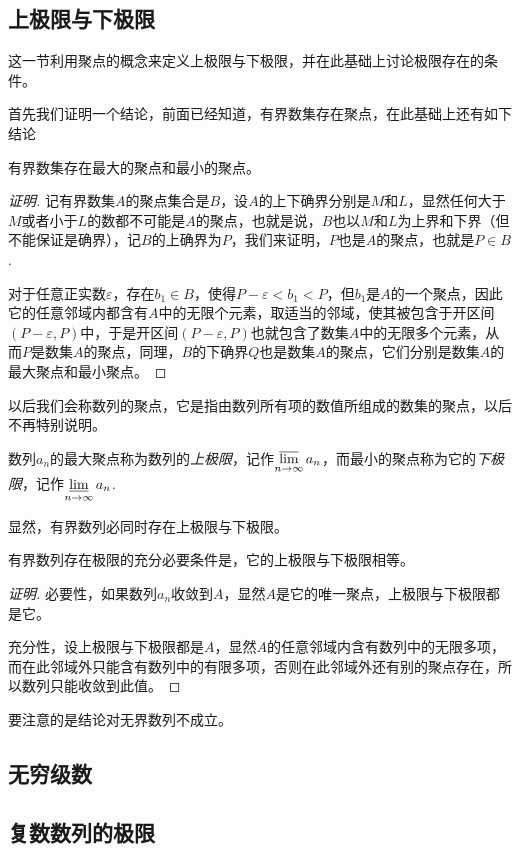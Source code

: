 \subsection{上极限与下极限}
\label{sec:upper-limit-and-lower-limit}

这一节利用聚点的概念来定义上极限与下极限，并在此基础上讨论极限存在的条件。

首先我们证明一个结论，前面已经知道，有界数集存在聚点，在此基础上还有如下结论
\begin{theorem}
  有界数集存在最大的聚点和最小的聚点。
\end{theorem}

\begin{proof}[证明]
  记有界数集$A$的聚点集合是$B$，设$A$的上下确界分别是$M$和$L$，显然任何大于$M$或者小于$L$的数都不可能是$A$的聚点，也就是说，$B$也以$M$和$L$为上界和下界（但不能保证是确界），记$B$的上确界为$P$，我们来证明，$P$也是$A$的聚点，也就是$P \in B$.

  对于任意正实数$\varepsilon$，存在$b_1 \in B$，使得$P-\varepsilon < b_1 < P$，但$b_1$是$A$的一个聚点，因此它的任意邻域内都含有$A$中的无限个元素，取适当的邻域，使其被包含于开区间$(P-\varepsilon,P)$中，于是开区间$(P-\varepsilon,P)$也就包含了数集$A$中的无限多个元素，从而$P$是数集$A$的聚点，同理，$B$的下确界$Q$也是数集$A$的聚点，它们分别是数集$A$的最大聚点和最小聚点。
\end{proof}

以后我们会称数列的聚点，它是指由数列所有项的数值所组成的数集的聚点，以后不再特别说明。

\begin{definition}
  数列$a_n$的最大聚点称为数列的\emph{上极限}，记作$\varlimsup\limits_{n \to \infty}a_n$，而最小的聚点称为它的\emph{下极限}，记作$\varliminf\limits_{n \to \infty} a_n$.
\end{definition}

显然，有界数列必同时存在上极限与下极限。

\begin{theorem}
有界数列存在极限的充分必要条件是，它的上极限与下极限相等。  
\end{theorem}

\begin{proof}[证明]
  必要性，如果数列$a_n$收敛到$A$，显然$A$是它的唯一聚点，上极限与下极限都是它。

  充分性，设上极限与下极限都是$A$，显然$A$的任意邻域内含有数列中的无限多项，而在此邻域外只能含有数列中的有限多项，否则在此邻域外还有别的聚点存在，所以数列只能收敛到此值。
\end{proof}

要注意的是结论对无界数列不成立。

\subsection{无穷级数}
\label{sec:infinite-series}

\subsection{复数数列的极限}
\label{sec:limit-of-complex-number-sequence}



